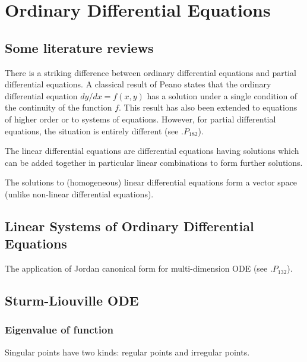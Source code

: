 \chapter{Ordinary Differential Equations}

\section{Some literature reviews}

There is a striking difference between ordinary differential equations and partial differential equations. A classical result of Peano states that the ordinary differential equation $dy/dx = f(x,y)$ has a solution under a single condition of the continuity of the function $f$. This result has also been extended to equations of higher order or to systems of equations. However, for partial differential equations, the situation is entirely different (see \cite{Yoshida_1980}.$P_{182}$).

\begin{definition}\label{def:linear_differentia_ equation}
The linear differential equations are differential equations having solutions which can be added together in particular linear combinations to form further solutions. 

The solutions to (homogeneous) linear differential equations form a vector space (unlike non-linear differential equations).
\end{definition}

\section{Linear Systems of Ordinary Differential Equations}

The application of Jordan canonical form for multi-dimension ODE (see \cite{Horn_Johnson_1990}.$P_{132}$).



\section{Sturm-Liouville ODE}

\subsection{Eigenvalue of function}

Singular points have two kinds: regular points and irregular points.

